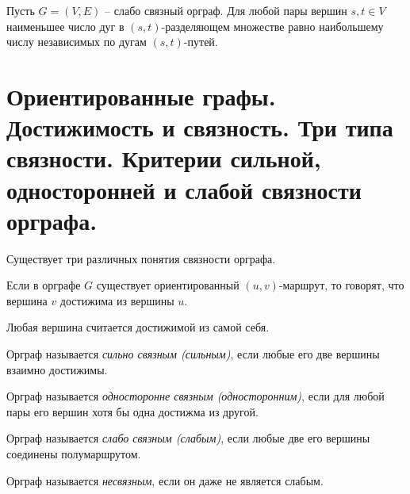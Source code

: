 \begin{theorem}
    Пусть $ G = (V,E) $ -- слабо связный орграф. Для любой пары вершин $ s,t \in V $ наименьшее число дуг в $ (s,t) $-разделяющем множестве равно наибольшему числу независимых по дугам $ (s,t) $-путей.
\end{theorem}

\section{Ориентированные графы. Достижимость и связность. Три типа связности. Критерии сильной, односторонней и слабой связности орграфа.}

\begin{note}
    Существует три различных понятия связности орграфа.
\end{note}

\begin{definition}
    Если в орграфе $ G $ существует ориентированный $ (u,v) $-маршрут, то говорят, что вершина $ v $ достижима из вершины $ u $.
\end{definition}

\begin{note}
    Любая вершина считается достижимой из самой себя.
\end{note}

\begin{definition}
    Орграф называется \emph{сильно связным (сильным)}, если любые его две вершины взаимно достижимы.
\end{definition}

\begin{definition}
    Орграф называется \emph{односторонне связным (односторонним)}, если для любой пары его вершин хотя бы одна достижма из другой.
\end{definition}

\begin{definition}
    Орграф называется \emph{слабо связным (слабым)}, если любые две его вершины соединены полумаршрутом.
\end{definition}

\begin{definition}
    Орграф называется \emph{несвязным}, если он даже не является слабым.
\end{definition}

